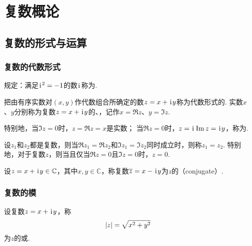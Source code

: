\chapter{复数概论}
\section{复数的形式与运算}
\subsection{复数的代数形式}
\begin{definition}[虚数单位]
规定：满足\(\kern1pt\mathrm{i}\kern1pt^2=-1\)的数\(\kern1pt\mathrm{i}\kern1pt\)称为.
\end{definition}

\begin{definition}
把由有序实数对\((x,y)\)作代数组合所确定的数\(z=x+\kern1pt\mathrm{i}\kern1pt y\)称为代数形式的.
实数\(x\)、\(y\)分别称为复数\(z=x+\kern1pt\mathrm{i}\kern1pt y\)的、，记作\(x=\Re z\)、\(y=\Im z\).

特别地，当\(\Im z=0\)时，\(z=\Re z=x\)是实数；
当\(\Re z=0\)时，\(z=\kern1pt\mathrm{i}\kern1pt\Im z=\kern1pt\mathrm{i}\kern1pt y\)，称为.
\end{definition}

\begin{definition}[代数形式下复数相等条件]
设\(z_1\)和\(z_2\)都是复数，则当\(\Re z_1 = \Re z_2\)和\(\Im z_1 = \Im z_2\)同时成立时，则称\(z_1 = z_2\).
特别地，对于复数\(z\)，则当且仅当\(\Re z=0\)且\(\Im z=0\)时，\(z=0\).
\end{definition}

\begin{definition}[共轭复数]
设\(z=x + \kern1pt\mathrm{i}\kern1pt y \in\mathbb{C}\)，其中\(x,y\in\mathbb{C}\)，称复数\(\overline{z}=x - \kern1pt\mathrm{i}\kern1pt y\)为\(z\)的（conjugate）.
\end{definition}

\subsection{复数的模}
\begin{definition}[复数的模]
设复数\(z = x + \kern1pt\mathrm{i}\kern1pt y\)，称\begin{equation*}
\abs{z} = \sqrt{x^2 + y^2}
\end{equation*}为\(z\)的或.
\end{definition}

